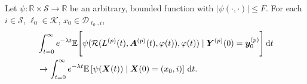 \begin{cor}\label{cor: lk}
	Let \(\psi: \mathbb R\times \mathcal S \to \mathbb R\) be an arbitrary, bounded function with \(|\psi(\cdot,\cdot)|\leq F\). %
	For each \(i\in\mathcal S\), \(\ell_0\in\mathcal K\), \(x_0\in\mathcal D_{\ell_0,i}\),
	\begin{align}
		&\int_{t=0}^\infty e^{-\lambda t}\mathbb E\Bigg[\psi(\mathcal R(L^{(p)}(t),\boldsymbol A^{(p)}(t),\varphi(t)),\varphi(t) )  \mid \nonumber
		\boldsymbol Y^{(p)}(0)=\boldsymbol y_0^{(p)} \Bigg] \, \mathrm{d} t \nonumber
		\\&\to \int_{t=0}^\infty e^{-\lambda t}  \mathbb E\left[\psi({\boldsymbol X}(t))\mid \boldsymbol X(0)=(x_0, i) \right] \, \mathrm{d} t.\nonumber
	\end{align}
\end{cor}

